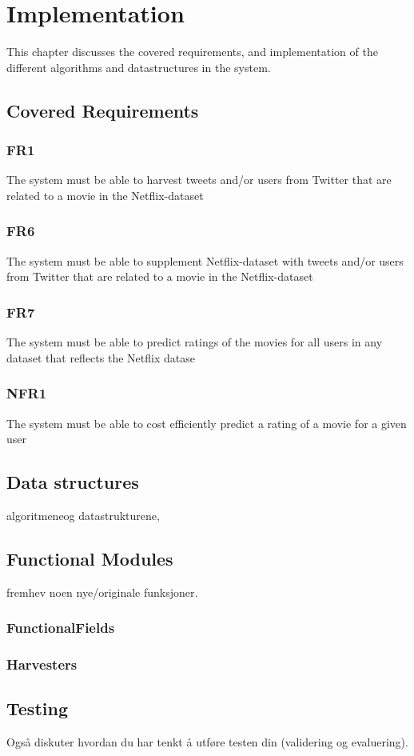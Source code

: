 
\chapter{Implementation}

\minitoc

This chapter discusses the covered requirements, and implementation of the different algorithms and datastructures in the system.

\clearpage

\section{Covered Requirements}
\subsection{FR1}
The system must be able to harvest tweets and/or users from Twitter that are related to a movie in the Netflix-dataset %
\subsection{FR6}
The system must be able to supplement Netflix-dataset with tweets and/or users from Twitter that are related to a movie in the Netflix-dataset %
\subsection{FR7}
The system must be able to predict ratings of the movies for all users in any dataset that reflects the Netflix datase %
\subsection{NFR1}
The system must be able to cost efficiently predict a rating of a movie for a given user %

\section{Data structures}
algoritmeneog datastrukturene,

\section{Functional Modules}
fremhev noen nye/originale funksjoner.
\subsection{FunctionalFields}
\subsection{Harvesters}

\section{Testing}
Også diskuter hvordan du har tenkt å utføre testen din (validering og evaluering).
